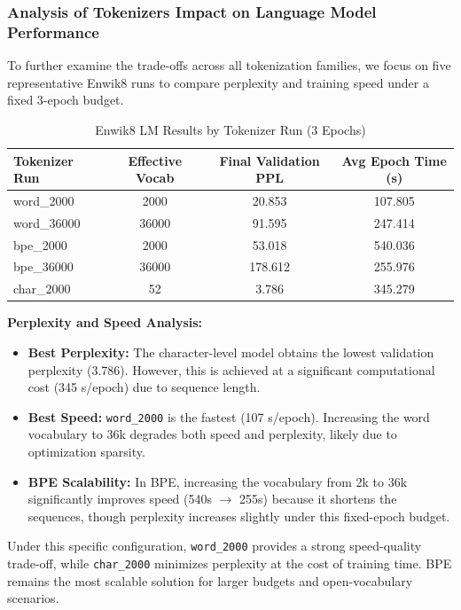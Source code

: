 \subsubsection{Analysis of Tokenizers Impact on Language Model Performance}
To further examine the trade-offs across all tokenization families, we focus on five representative Enwik8 runs to compare perplexity and training speed under a fixed 3-epoch budget.

\begin{table}[H]
\centering
\caption{Enwik8 LM Results by Tokenizer Run (3 Epochs)}
\renewcommand{\arraystretch}{1.1}
\begin{tabular}{|l|c|c|c|}
\hline
\textbf{Tokenizer Run} & \textbf{Effective Vocab} & \textbf{Final Validation PPL} & \textbf{Avg Epoch Time (s)} \\ \hline
word\_2000 & 2000 & 20.853 & 107.805 \\ \hline
word\_36000 & 36000 & 91.595 & 247.414 \\ \hline
bpe\_2000 & 2000 & 53.018 & 540.036 \\ \hline
bpe\_36000 & 36000 & 178.612 & 255.976 \\ \hline
char\_2000 & 52 & 3.786 & 345.279 \\ \hline
\end{tabular}
\end{table}

\textbf{Perplexity and Speed Analysis:}
\begin{itemize}
    \item \textbf{Best Perplexity:} The character-level model obtains the lowest validation perplexity (3.786). However, this is achieved at a significant computational cost (345 s/epoch) due to sequence length.
    \item \textbf{Best Speed:} \texttt{word\_2000} is the fastest (107 s/epoch). Increasing the word vocabulary to 36k degrades both speed and perplexity, likely due to optimization sparsity.
    \item \textbf{BPE Scalability:} In BPE, increasing the vocabulary from 2k to 36k significantly improves speed (540s $\rightarrow$ 255s) because it shortens the sequences, though perplexity increases slightly under this fixed-epoch budget.
\end{itemize}

Under this specific configuration, \texttt{word\_2000} provides a strong speed-quality trade-off, while \texttt{char\_2000} minimizes perplexity at the cost of training time. BPE remains the most scalable solution for larger budgets and open-vocabulary scenarios.
